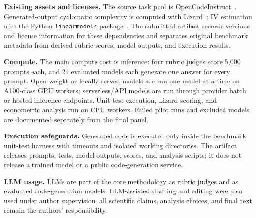 \documentclass{article}
\begin{document}
\textbf{Existing assets and licenses.} The source task pool is OpenCodeInstruct~\cite{opencodeinst}. Generated-output cyclomatic complexity is computed with Lizard~\cite{lizard}; IV estimation uses the Python \texttt{linearmodels} package~\cite{linearmodels}. The submitted artifact records versions and license information for these dependencies and separates original benchmark metadata from derived rubric scores, model outputs, and execution results.

\textbf{Compute.} The main compute cost is inference: four rubric judges score 5{,}000 prompts each, and 21 evaluated models each generate one answer for every prompt. Open-weight or locally served models are run one model at a time on A100-class GPU workers; serverless/API models are run through provider batch or hosted inference endpoints. Unit-test execution, Lizard scoring, and econometric analysis run on CPU workers. Failed pilot runs and excluded models are documented separately from the final panel.

\textbf{Execution safeguards.} Generated code is executed only inside the benchmark unit-test harness with timeouts and isolated working directories. The artifact releases prompts, tests, model outputs, scores, and analysis scripts; it does not release a trained model or a public code-generation service.

\textbf{LLM usage.} LLMs are part of the core methodology as rubric judges and as evaluated code-generation models. LLM-assisted drafting and editing were also used under author supervision; all scientific claims, analysis choices, and final text remain the authors' responsibility.

\newpage

\end{document}
